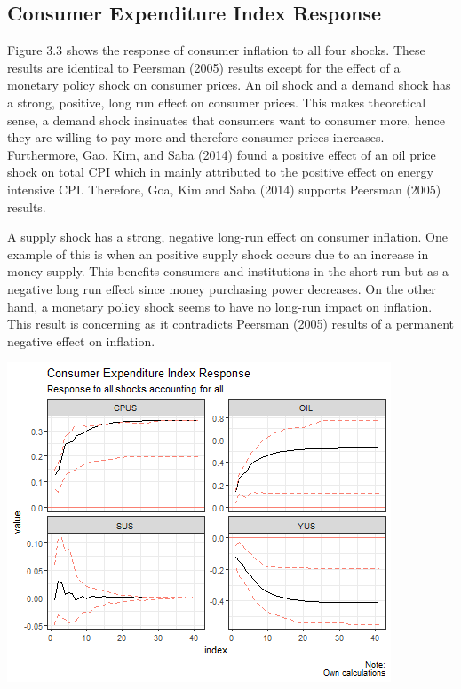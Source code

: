 \documentclass[11pt,preprint, authoryear]{elsarticle}
\let\origfigure\figure
\let\endorigfigure\endfigure
\renewenvironment{figure}[1][2] {
    \expandafter\origfigure\expandafter[H]
} {
    \endorigfigure
}
\numberwithin{equation}{section}
\numberwithin{figure}{section}
\numberwithin{table}{section}
\begin{document}
\hypertarget{consumer-expenditure-index-response}{%
\subsection{Consumer Expenditure Index
Response}\label{consumer-expenditure-index-response}}

Figure 3.3 shows the response of consumer inflation to all four shocks.
These results are identical to Peersman (2005) results except for the
effect of a monetary policy shock on consumer prices. An oil shock and a
demand shock has a strong, positive, long run effect on consumer prices.
This makes theoretical sense, a demand shock insinuates that consumers
want to consumer more, hence they are willing to pay more and therefore
consumer prices increases. Furthermore, Gao, Kim, and Saba (2014) found
a positive effect of an oil price shock on total CPI which in mainly
attributed to the positive effect on energy intensive CPI. Therefore,
Goa, Kim and Saba (2014) supports Peersman (2005) results.

A supply shock has a strong, negative long-run effect on consumer
inflation. One example of this is when an positive supply shock occurs
due to an increase in money supply. This benefits consumers and
institutions in the short run but as a negative long run effect since
money purchasing power decreases. On the other hand, a monetary policy
shock seems to have no long-run impact on inflation. This result is
concerning as it contradicts Peersman (2005) results of a permanent
negative effect on inflation.

\begin{figure}[H]

{\centering \includegraphics{replication_files/figure-latex/Figure4-1} 

}

\caption{Consumer Expenditure Index\label{Figure4}}\label{fig:Figure4}
\end{figure}
\end{document}
